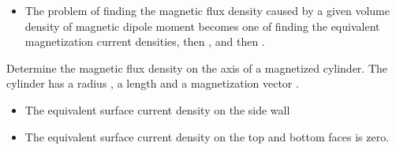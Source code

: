 \begin{ELjoin}

\begin{itemize}
\tightlist
\item
  The problem of finding the magnetic flux density  caused by a given volume density of magnetic dipole moment  becomes one of finding the equivalent magnetization current densities, then , and then .
\end{itemize}


\begin{ELexample}{}

Determine the magnetic flux density on the axis of a magnetized cylinder. The cylinder has a radius , a length  and a magnetization vector .


\begin{ELsolution}


\begin{itemize}
\tightlist
\item
  The equivalent surface current density on the side wall
\end{itemize}


\begin{itemize}
\tightlist
\item
  The equivalent surface current density on the top and bottom faces is zero.
\end{itemize}



\end{ELsolution}
\end{ELexample}
\end{ELjoin}
